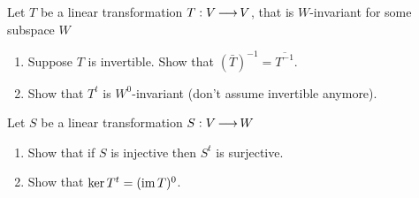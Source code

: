 \documentclass{amsart}
\begin{document}
	Let $T$ be a linear transformation $T: V \operatorname{\longrightarrow} V$, that is $W$-invariant for some subspace $W$
	\begin{enumerate}
		\item Suppose $T$ is invertible. Show that $(\bar T)^{-1} = \overline {T^{-1}} $.
		\item Show that $T^t$ is $W^0$-invariant (don't assume invertible anymore).
	\end{enumerate}

	Let $S$ be a linear transformation $S: V \operatorname{\longrightarrow} W$	
	
	\begin{enumerate}
		\item Show that if $S$ is injective then $S^t$ is surjective.
		\item Show that $\ker T^t = (\operatorname{im} T)^0$.
	\end{enumerate}
\end{document}
